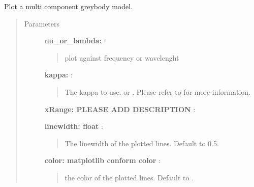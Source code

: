 \documentclass[a4paper,10pt,english]{sphinxmanual}
\begin{document}
\begin{fulllineitems}
\begin{fulllineitems}
\begin{description}
\end{description}



\end{fulllineitems}


\begin{fulllineitems}
\label{sed:astrolyze.sed.sed.Sed.plot_sed}
Plot a multi component greybody model.
\begin{quote}\begin{description}
\item[{Parameters }] \leavevmode
\textbf{nu\_or\_lambda:} :
\begin{quote}

plot against frequency  or wavelenght 
\end{quote}

\textbf{kappa:} :
\begin{quote}

The kappa to use.  or . Please refer
to  for more
information.
\end{quote}

\textbf{xRange: PLEASE ADD DESCRIPTION} :

\textbf{linewidth: float} :
\begin{quote}

The linewidth of the plotted lines. Default to 0.5.
\end{quote}

\textbf{color: matplotlib conform color} :
\begin{quote}

the color of the plotted lines. Default to .
\end{quote}

\end{description}\end{quote}

\end{fulllineitems}


\end{fulllineitems}

\end{document}
